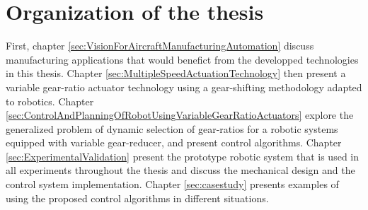 \section{Organization of the thesis}
\label{sec:OrganisationOfTheThesis}

First, chapter \ref{sec:VisionForAircraftManufacturingAutomation} discuss manufacturing applications that would benefict from the developped technologies in this thesis. Chapter \ref{sec:MultipleSpeedActuationTechnology} then present a variable gear-ratio actuator technology using a gear-shifting methodology adapted to robotics. Chapter \ref{sec:ControlAndPlanningOfRobotUsingVariableGearRatioActuators} explore the generalized problem of dynamic selection of gear-ratios for a robotic systems equipped with variable gear-reducer, and present control algorithms. Chapter \ref{sec:ExperimentalValidation} present the prototype robotic system that is used in all experiments throughout the thesis and discuss the mechanical design and the control system implementation. Chapter \ref{sec:casestudy} presents examples of using the proposed control algorithms in different situations.


